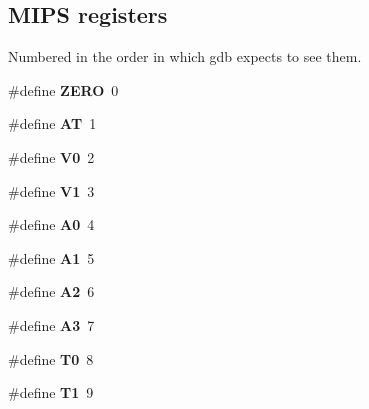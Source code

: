 \subsection*{M\+I\+PS registers}
\label{_amgrpc688484ab2abe8500f1919438b7152af}%
Numbered in the order in which gdb expects to see them. \begin{DoxyCompactItemize}
\item 
\mbox{\label{group__mips__gdb_gac328e551bde3d39b6d7b8cc9e048d941}} 
\#define {\bfseries Z\+E\+RO}~0
\item 
\mbox{\label{group__mips__gdb_gad37a804df2a1060b453ce07fe0ee3cbc}} 
\#define {\bfseries AT}~1
\item 
\mbox{\label{group__mips__gdb_ga2074b9a2c1c6a3190319241fd96ebdd5}} 
\#define {\bfseries V0}~2
\item 
\mbox{\label{group__mips__gdb_gae21a9518b4dd62d2baeab430c89a657a}} 
\#define {\bfseries V1}~3
\item 
\mbox{\label{group__mips__gdb_ga0d158f1e3af2ab523eb8423db3e5bd6e}} 
\#define {\bfseries A0}~4
\item 
\mbox{\label{group__mips__gdb_gacd92b430059d886880c53f13ae038e3f}} 
\#define {\bfseries A1}~5
\item 
\mbox{\label{group__mips__gdb_ga2946bc30423c2a996eeafa49e995c30e}} 
\#define {\bfseries A2}~6
\item 
\mbox{\label{group__mips__gdb_ga48cdc6c9a75eb611d0a703c94bdac6b8}} 
\#define {\bfseries A3}~7
\item 
\mbox{\label{group__mips__gdb_gad41b89d4eb6d63a0def5e5fd2a5ab326}} 
\#define {\bfseries T0}~8
\item 
\mbox{\label{group__mips__gdb_gac16509a75e3d3fc46b9df1726be486ec}} 
\#define {\bfseries T1}~9
\item 
\mbox{\label{group__mips__gdb_ga259c2993ee45e06a4ea8150451a7a70e}} 

\end{DoxyCompactItemize}
